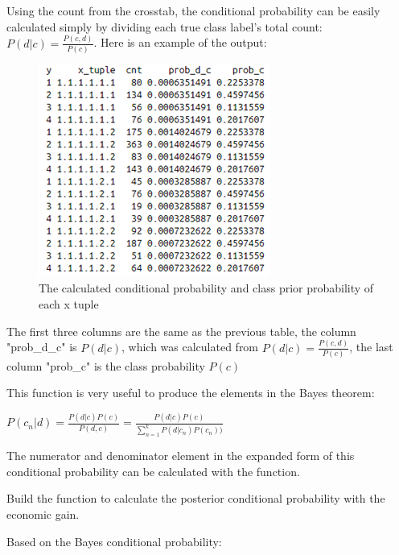 \documentclass{article}
\begin{document}
\begin{multicols}{2}
        Using the count from the crosstab, the conditional probability can be easily calculated simply by dividing each true class label's total count: $P(d|c) = \frac{P(c,d)}{P(c)}$. Here is an example of the output:

        \begin{figure}[H]
            \centering  
            \includegraphics[width=\linewidth]{fig6.png}
            \caption{The calculated conditional probability and class prior probability of each x tuple}
        \end{figure}

        The first three columns are the same as the previous table, the column "prob\_d\_c" is $P(d|c)$, which was calculated from  $P(d|c) = \frac{P(c,d)}{P(c)}$, the last column "prob\_c" is the class probability $P(c)$

        This function is very useful to produce the elements in the Bayes theorem:

        $P(c_n|d)= \frac{P(d | c)P(c)}{P(d,c)} = \frac{P(d|c)P(c)}{\sum_{n=1}^k P(d|c_n)P(c_n))}$

        The numerator and denominator element in the expanded form of this conditional probability can be calculated with the function.

        Build the function to calculate the posterior conditional probability with the economic gain.

        Based on the Bayes conditional probability:


\end{multicols}
\end{document}
